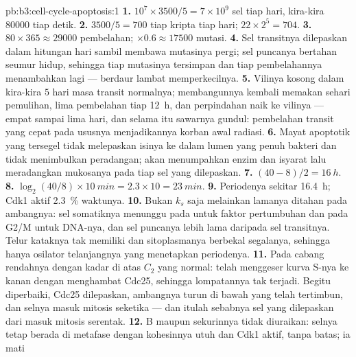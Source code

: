 \begin{solution}{pb:b3:cell-cycle-apoptosis:1}
\textbf{1.} $10^{7}\times 3500/5 = 7\times 10^{9}$ sel tiap hari, kira-kira
\num{80000} tiap detik.
\textbf{2.} $3500/5 = 700$ tiap kripta tiap hari; $22\times 2^{5} = 704$.
\textbf{3.} $80\times 365 \approx \num{29000}$ pembelahan; $\times 0.6
\approx \num{17500}$ mutasi.
\textbf{4.} Sel transitnya dilepaskan dalam hitungan hari sambil membawa
mutasinya pergi; sel puncanya bertahan seumur hidup, sehingga tiap mutasinya
tersimpan dan tiap pembelahannya menambahkan lagi --- berdaur lambat
memperkecilnya.
\textbf{5.} Vilinya kosong dalam kira-kira $5$ hari masa transit normalnya;
membangunnya kembali memakan sehari pemulihan, lima pembelahan tiap
\qty{12}{h}, dan perpindahan naik ke vilinya --- empat sampai lima hari, dan
selama itu sawarnya gundul: pembelahan transit yang cepat pada ususnya
menjadikannya korban awal radiasi.
\textbf{6.} Mayat apoptotik yang tersegel tidak melepaskan isinya ke dalam
lumen yang penuh bakteri dan tidak menimbulkan peradangan;  akan
menumpahkan enzim dan isyarat lalu meradangkan mukosanya pada tiap sel yang
dilepaskan.
\textbf{7.} $(40 - 8)/2 = \qty{16}{h}$.
\textbf{8.} $\log_{2}(40/8)\times \qty{10}{min} = 2.3\times 10 =
\qty{23}{min}$.
\textbf{9.} Periodenya sekitar \qty{16.4}{h}; Cdk1 aktif \qty{2.3}{\%}
waktunya.
\textbf{10.} Bukan $k_{s}$ saja melainkan lamanya ditahan pada ambangnya:
sel somatiknya menunggu pada  untuk faktor pertumbuhan dan pada
G2/M untuk DNA-nya, dan sel puncanya lebih lama daripada sel transitnya. Telur
kataknya tak memiliki  dan sitoplasmanya berbekal segalanya,
sehingga hanya osilator telanjangnya yang menetapkan periodenya.
\textbf{11.} Pada cabang rendahnya dengan kadar  di atas $C_{2}$ yang
normal:  telah menggeser kurva S-nya ke kanan dengan
menghambat Cdc25, sehingga lompatannya tak terjadi. Begitu diperbaiki, Cdc25
dilepaskan, ambangnya turun di bawah  yang telah tertimbun, dan
selnya masuk mitosis seketika --- dan itulah sebabnya sel yang dilepaskan dari
 masuk mitosis serentak.
\textbf{12.}  B maupun sekurinnya tidak diuraikan: selnya tetap berada
di metafase dengan kohesinnya utuh dan Cdk1 aktif, tanpa batas; ia mati

\end{solution}
